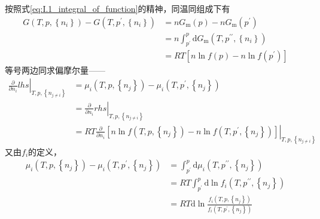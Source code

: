 \documentclass[main.tex]{subfiles}
\begin{document}
按照式\eqref{eq:I.1_integral_of_function}的精神，同温同组成下有
\begin{align*}
    G\left(T,p,\left\{n_i\right\}\right)-G\left(T,p^\prime,\left\{n_i\right\}\right) & =nG_\text{m}\left(p\right)-nG_\text{m}\left(p^\prime\right)                               \\
                                                                                     & =n\int_{p^\prime}^p\mathrm{d}G_\text{m}\left(T,p^{\prime\prime},\left\{n_i\right\}\right) \\
                                                                                     & =RT\left[n\ln f\left(p\right)-n\ln f\left(p^\prime\right)\right]
\end{align*}
等号两边同求偏摩尔量——
\begin{align*}
    \left.\frac{\partial}{\partial n_i}lhs\right|_{T,p,\left\{n_{j\neq i}\right\}} & =\mu_i\left(T,p,\left\{n_j\right\}\right)-\mu_i\left(T,p^\prime,\left\{n_j\right\}\right)                                                                                             \\
                                                                                   & =\left.\frac{\partial}{\partial n_i}rhs\right|_{T,p,\left\{n_{j\neq i}\right\}}                                                                                                       \\
                                                                                   & =RT\left.\frac{\partial}{\partial n_i}\left[n\ln f\left(T,p,\left\{n_j\right\}\right)-n\ln f\left(T,p^\prime,\left\{n_j\right\}\right)\right]\right|_{T,p,\left\{n_{j\neq i}\right\}}
\end{align*}
又由$f_i$的定义，
\begin{align*}
    \mu_i\left(T,p,\left\{n_j\right\}\right)-\mu_i\left(T,p^\prime,\left\{n_j\right\}\right) & =\int_{p^\prime}^p\mathrm{d}\mu_i\left(T,p^{\prime\prime},\left\{n_j\right\}\right)                          \\
                                                                                             & =RT\int_{p^\prime}^p\mathrm{d}\ln f_i\left(T,p^{\prime\prime},\left\{n_j\right\}\right)                      \\
                                                                                             & =RT\mathrm{d}\ln\frac{f_i\left(T,p,\left\{n_j\right\}\right)}{f_i\left(T,p^\prime,\left\{n_j\right\}\right)}
\end{align*}
\end{document}
